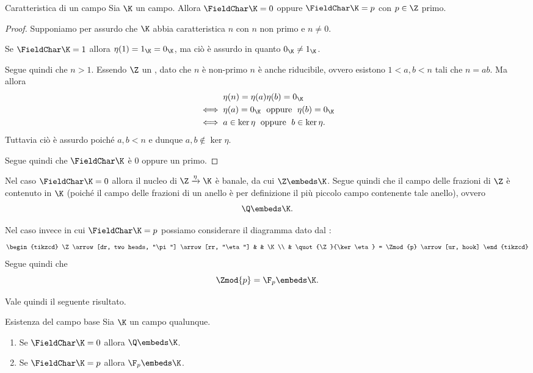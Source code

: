 \begin{proposition}
    {Caratteristica di un campo}{}
    Sia $\K$ un campo. Allora $\FieldChar \K = 0$ oppure $\FieldChar \K = p$ con $p \in \Z$ primo.
\end{proposition}
\begin{proof}
    Supponiamo per assurdo che $\K$ abbia caratteristica $n$ con $n$ non primo e $n \neq 0$. 
    
    Se $\FieldChar \K = 1$ allora $\eta(1) = 1_{\K} = 0_{\K}$, ma ciò è assurdo in quanto $0_{\K} \neq 1_{\K}$. 
    
    Segue quindi che $n > 1$. Essendo $\Z$ un \UFD, dato che $n$ è non-primo $n$ è anche riducibile, ovvero esistono $1 < a, b < n$ tali che $n = ab$. Ma allora \begin{align*}
        &\eta(n)
        = \eta(a)\eta(b)
        = 0_{\K} \\
        \iff {}&\eta(a) = 0_{\K} \;\text{ oppure }\; \eta(b) = 0_{\K} \\
        \iff {}&
        a \in \ker \eta \;\text{ oppure }\; b \in \ker \eta.
    \end{align*} 
    Tuttavia ciò è assurdo poiché $a, b < n$ e dunque $a, b \notin \ker \eta$.
    
    Segue quindi che $\FieldChar \K$ è $0$ oppure un primo. 
\end{proof}

Nel caso $\FieldChar \K = 0$ allora il nucleo di $\Z \xrightarrow{\eta} \K$ è banale, da cui $\Z \embeds \K$. Segue quindi che il campo delle frazioni di $\Z$ è contenuto in $\K$ (poiché il campo delle frazioni di un anello è per definizione il più piccolo campo contenente tale anello), ovvero \[
    \Q \embeds \K.
\]  

Nel caso invece in cui $\FieldChar \K = p$ possiamo considerare il diagramma dato dal : \[
    \begin{tikzcd}
        \Z \arrow[dr, two heads, "\pi"] \arrow[rr, "\eta"] & & \K \\
        & \quot{\Z}{\ker \eta} = \Zmod{p} \arrow[ur, hook] 
    \end{tikzcd}
\] Segue quindi che \[
    \Zmod{p} = \F_p \embeds \K.
\]

Vale quindi il seguente risultato.
\begin{theorem}
    {Esistenza del campo base}{}
    Sia $\K$ un campo qualunque.
    \begin{enumerate}[(1)]
        \item Se $\FieldChar \K = 0$ allora $\Q \embeds \K$.
        \item Se $\FieldChar \K = p$ allora $\F_p \embeds \K$.  
    \end{enumerate}
\end{theorem}

